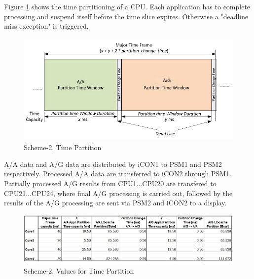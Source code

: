 Figure \ref{fig:existing_analysis:scheme2_partition} shows the time partitioning of a CPU. Each application has to complete processing and suspend itself before the time slice expires. Otherwise a "deadline miss exception" is triggered.

\begin{figure}[h!]
	\centering
	\includegraphics[height=55mm]{figures/scheme2_partition}
	\caption{Scheme-2, Time Partition}
	\label{fig:existing_analysis:scheme2_partition}
\end{figure}

A/A data and A/G data are distributed by iCON1 to PSM1 and PSM2 respectively. Processed A/A data are transferred to iCON2 through PSM1. Partially processed A/G results from CPU1...CPU20 are transfered to CPU21...CPU24, where final A/G processing is carried out, followed by the results of the A/G processing are sent via PSM2 and iCON2 to a display.

\begin{figure}[h!]
	\centering
	\includegraphics[width=150mm]{figures/scheme2_partition_values}
	\caption{Scheme-2, Values for Time Partition}
	\label{fig:existing_analysis:scheme2_partition_values}
\end{figure}

